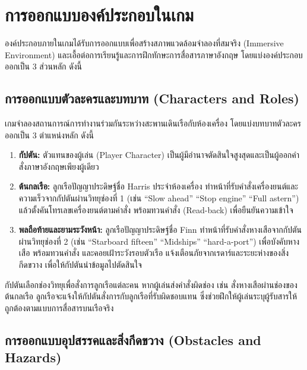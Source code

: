 
\section{การออกแบบองค์ประกอบในเกม}

องค์ประกอบภายในเกมได้รับการออกแบบเพื่อสร้างสภาพแวดล้อมจำลองที่สมจริง (Immersive Environment) และเอื้อต่อการเรียนรู้และการฝึกทักษะการสื่อสารภาษาอังกฤษ โดยแบ่งองค์ประกอบออกเป็น 3 ส่วนหลัก ดังนี้

\subsection{การออกแบบตัวละครและบทบาท (Characters and Roles)}

เกมจำลองสถานการณ์การทำงานร่วมกันระหว่างสะพานเดินเรือกับห้องเครื่อง โดยแบ่งบทบาทตัวละครออกเป็น 3 ตำแหน่งหลัก ดังนี้

\begin{enumerate}[label=\arabic*)]
    \item \textbf{กัปตัน:} ตัวแทนของผู้เล่น (Player Character) เป็นผู้มีอำนาจตัดสินใจสูงสุดและเป็นผู้ออกคำสั่งภาษาอังกฤษเพียงผู้เดียว
    \item \textbf{ต้นกลเรือ:} ลูกเรือปัญญาประดิษฐ์ชื่อ Harris ประจำห้องเครื่อง ทำหน้าที่รับคำสั่งเครื่องยนต์และความเร็วจากกัปตันผ่านวิทยุช่องที่ 1 (เช่น ``Slow ahead'' ``Stop engine'' ``Full astern'') แล้วตั้งคันโทรเลขเครื่องยนต์ตามคำสั่ง พร้อมทวนคำสั่ง (Read-back) เพื่อยืนยันความเข้าใจ
    \item \textbf{พลถือท้ายและยามระวังหน้า:} ลูกเรือปัญญาประดิษฐ์ชื่อ Finn ทำหน้าที่รับคำสั่งหางเสือจากกัปตันผ่านวิทยุช่องที่ 2 (เช่น ``Starboard fifteen'' ``Midships'' ``hard-a-port'') เพื่อบังคับหางเสือ พร้อมทวนคำสั่ง และคอยเฝ้าระวังรอบตัวเรือ แจ้งเตือนภัยจากเรดาร์และระยะห่างของสิ่งกีดขวาง เพื่อให้กัปตันนำข้อมูลไปตัดสินใจ
\end{enumerate}

กัปตันเลือกช่องวิทยุเพื่อสั่งการลูกเรือแต่ละคน หากผู้เล่นส่งคำสั่งผิดช่อง เช่น สั่งหางเสือผ่านช่องของต้นกลเรือ ลูกเรือจะแจ้งให้กัปตันสั่งการกับลูกเรือที่รับผิดชอบแทน ซึ่งช่วยฝึกให้ผู้เล่นระบุผู้รับสารให้ถูกต้องตามแบบการสื่อสารบนเรือจริง

\subsection{การออกแบบอุปสรรคและสิ่งกีดขวาง (Obstacles and Hazards)}

